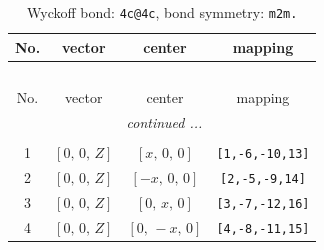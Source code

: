 \documentclass[fleqn,8pt]{jsarticle}
\begin{document}
\renewcommand{\arraystretch}{1.2}
\begin{longtable}{cccc}
\caption{Wyckoff bond: {\tt 4c@4c}, bond symmetry: {\tt m2m.}}
 \\
 \hline \hline
No. & vector & center & mapping \\ \hline \endfirsthead

\multicolumn{3}{l}{\tablename\ \thetable{}} \\
 \hline \hline
No. & vector & center & mapping \\ \hline \endhead

 \hline \hline
\multicolumn{3}{r}{\footnotesize\it continued ...} \\ \endfoot

 \hline \hline
\multicolumn{3}{r}{} \\ \endlastfoot

1 & $\left[ 0,\, 0,\, Z \right]$ & $\left[ x,\, 0,\, 0 \right]$ & {\tt [1,-6,-10,13]} \\ \hline
2 & $\left[ 0,\, 0,\, Z \right]$ & $\left[ - x,\, 0,\, 0 \right]$ & {\tt [2,-5,-9,14]} \\ \hline
3 & $\left[ 0,\, 0,\, Z \right]$ & $\left[ 0,\, x,\, 0 \right]$ & {\tt [3,-7,-12,16]} \\ \hline
4 & $\left[ 0,\, 0,\, Z \right]$ & $\left[ 0,\, - x,\, 0 \right]$ & {\tt [4,-8,-11,15]} \\
\end{longtable}
\renewcommand{\arraystretch}{1.2}
\end{document}
